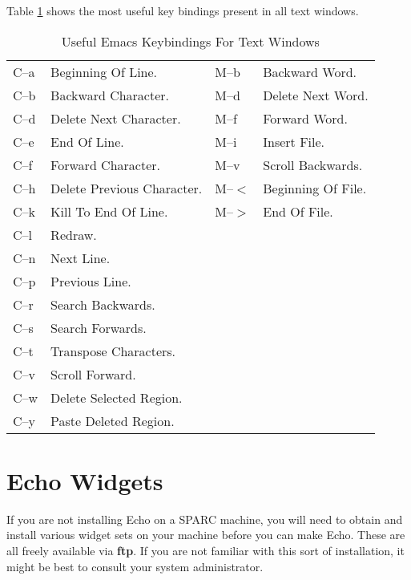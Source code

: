 Table \ref{emacs-keybindings-table} shows the most useful key bindings
present in all text windows.

\begin{table}
\begin{center}
\begin{tabular}{||l|l||l|l||}
\hline
{\sf C--a} & Beginning Of Line.         & {\sf M--b}   & Backward Word. \\
{\sf C--b} & Backward Character.        & {\sf M--d}   & Delete Next Word. \\
{\sf C--d} & Delete Next Character.     & {\sf M--f}   & Forward Word. \\
{\sf C--e} & End Of Line.               & {\sf M--i}   & Insert File. \\
{\sf C--f} & Forward Character.         & {\sf M--v}   & Scroll Backwards. \\
{\sf C--h} & Delete Previous Character. & {\sf M--$<$} & Beginning Of File. \\
{\sf C--k} & Kill To End Of Line.       & {\sf M--$>$} & End Of File. \\
{\sf C--l} & Redraw. & & \\
{\sf C--n} & Next Line. & & \\
{\sf C--p} & Previous Line. & & \\
{\sf C--r} & Search Backwards. & & \\
{\sf C--s} & Search Forwards. & & \\
{\sf C--t} & Transpose Characters. & & \\
{\sf C--v} & Scroll Forward. & & \\
{\sf C--w} & Delete Selected Region. & & \\
{\sf C--y} & Paste Deleted Region. & & \\
\hline
\end{tabular}
\end{center}
\caption{Useful Emacs Keybindings For Text Windows}
\label{emacs-keybindings-table}
\end{table}

\newpage
\section{Echo Widgets}
\label{echo-widgets}

If you are not installing Echo on a SPARC machine, you will need to
obtain and install various widget sets on your machine before you can
make Echo. These are all freely available via {\bf ftp}. If you are
not familiar with this sort of installation, it might be best to
consult your system administrator.

